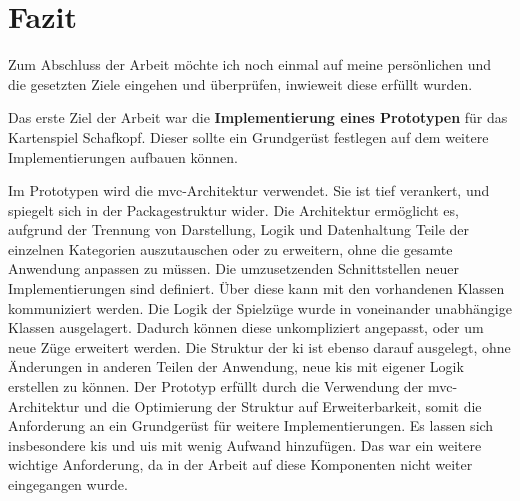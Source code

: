 \documentclass[
							a4paper, 
							11pt, 
							openany, 
							liststotoc,
							parskip=half, 
   							headings=normal
						]{scrreprt}
\begin{document}
{\clearpage



\chapter{Fazit} \label{ch:fazit}

Zum Abschluss der Arbeit möchte ich noch einmal auf meine persönlichen und die gesetzten Ziele eingehen und überprüfen, inwieweit diese erfüllt wurden.

Das erste Ziel der Arbeit war die \textbf{Implementierung eines Prototypen} für das Kartenspiel Schafkopf. Dieser sollte ein Grundgerüst festlegen auf dem weitere Implementierungen aufbauen können.

Im Prototypen wird die \acs{mvc}-Architektur verwendet. Sie ist tief verankert, und spiegelt sich in der Packagestruktur wider. Die Architektur er\-mö\-glicht es, aufgrund der Trennung von Darstellung, Logik und Datenhaltung Teile der einzelnen Kategorien auszutauschen oder zu erweitern, ohne die gesamte Anwendung anpassen zu müssen. Die umzusetzenden Schnittstellen neuer Implementierungen sind definiert. Über diese kann mit den vorhandenen Klassen kommuniziert werden. \newline
Die Logik der Spielzüge wurde in voneinander unabhängige Klassen ausgelagert. Dadurch können diese unkompliziert angepasst, oder um neue Züge erweitert werden. Die Struktur der \acs{ki} ist ebenso darauf ausgelegt, ohne Änderungen in anderen Teilen der Anwendung, neue \acs{ki}s mit eigener Logik erstellen zu können.\newline
Der Prototyp erfüllt durch die Verwendung der \acs{mvc}-Architektur und die Optimierung der Struktur auf Erweiterbarkeit, somit die Anforderung an ein Grundgerüst für weitere Implementierungen. Es lassen sich insbesondere \acs{ki}s und \acs{ui}s mit wenig Aufwand hinzufügen. Das war ein weitere wichtige Anforderung, da in der Arbeit auf diese Komponenten nicht weiter eingegangen wurde.

}
\end{document}
